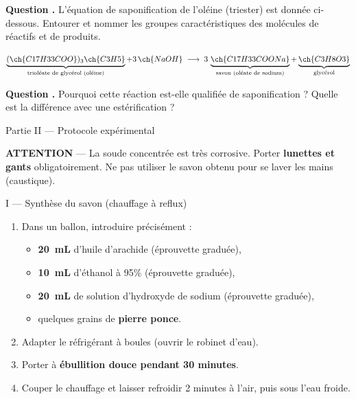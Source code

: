 \documentclass[11pt,a4paper]{article}
\newcommand{\sectitle}[1]{%
  \vspace{6pt}
  \noindent\colorbox{exoheader}{\parbox{\dimexpr\linewidth-2\fboxsep}%
    {\color{white}\bfseries\large\strut\quad #1}}
  \vspace{4pt}
}
\newcommand{\subsectitle}[1]{%
  \vspace{4pt}
  \noindent\colorbox{exolight}{\parbox{\dimexpr\linewidth-2\fboxsep}%
    {\color{exoheader}\bfseries\strut\quad #1}}
  \vspace{2pt}
}
\newcounter{question}
\newcommand{\question}{%
  \stepcounter{question}%
  \noindent\textcolor{exoheader}{\textbf{Question \thequestion.}}\quad
}
\begin{document}
\vspace{4pt}
\question L'équation de saponification de l'oléine (triester) est donnée ci-dessous.
Entourer et nommer les groupes caractéristiques des molécules de réactifs et de produits.

\vspace{0.5cm}
\begin{center}
\begin{mdframed}[backgroundcolor=white, linecolor=exoheader, linewidth=1.5pt]
\[
  \underbrace{(\ch{C17H33COO})_3\ch{C3H5}}_{\text{trioléate de glycérol (oléine)}}
  + 3\,\ch{NaOH}
  \;\longrightarrow\;
  3\,\underbrace{\ch{C17H33COONa}}_{\text{savon (oléate de sodium)}}
  + \underbrace{\ch{C3H8O3}}_{\text{glycérol}}
\]
\end{mdframed}
\end{center}

\vspace{4pt}
\question Pourquoi cette réaction est-elle qualifiée de \og saponification \fg{} ?
Quelle est la différence avec une estérification ? \dotfill

\vspace{0.3cm}\noindent\dotfill

\sectitle{Partie II --- Protocole expérimental}

\begin{mdframed}[backgroundcolor=orange!15, linecolor=warnorange, linewidth=2pt]
\textbf{\textcolor{warnorange}{\faExclamationTriangle\quad ATTENTION}} ---
La soude concentrée est très corrosive. Porter \textbf{lunettes et gants} obligatoirement.
Ne pas utiliser le savon obtenu pour se laver les mains (caustique).
\end{mdframed}

\vspace{4pt}
\subsectitle{I --- Synthèse du savon (chauffage à reflux)}

\begin{enumerate}[leftmargin=1.5cm, label=\textcolor{exoheader}{\textbf{\arabic*.}}]
  \item Dans un ballon, introduire précisément :
    \begin{itemize}
      \item \textbf{20~mL} d'huile d'arachide (éprouvette graduée),
      \item \textbf{10~mL} d'éthanol à 95\% (éprouvette graduée),
      \item \textbf{20~mL} de solution d'hydroxyde de sodium (éprouvette graduée),
      \item quelques grains de \textbf{pierre ponce}.
    \end{itemize}
  \item Adapter le réfrigérant à boules (ouvrir le robinet d'eau).
  \item Porter à \textbf{ébullition douce pendant 30 minutes}.
  \item Couper le chauffage et laisser refroidir 2 minutes à l'air, puis sous l'eau froide.
\end{enumerate}
\end{document}
